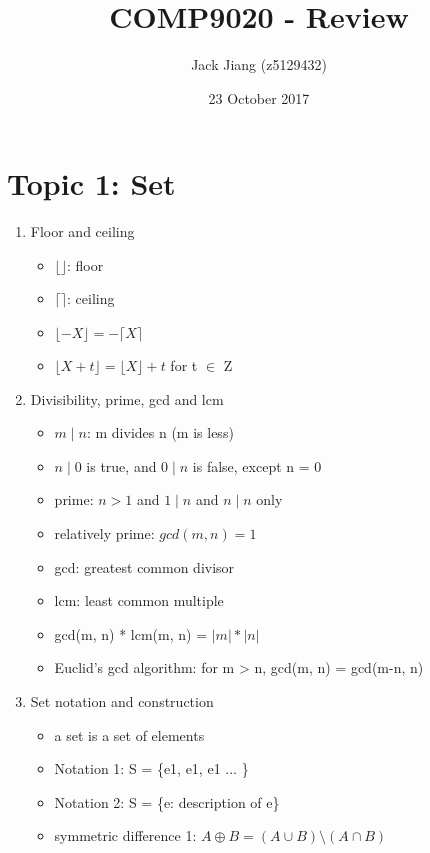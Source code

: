 \documentclass[11pt, a4paper]{article}
\begin{document}
\title{COMP9020 - Review}
\author{Jack Jiang (z5129432)}
\date{ 23 October 2017 }
\maketitle
\graphicspath{{/}}

\section*{Topic 1: Set}
\begin{enumerate}
    \item Floor and ceiling
        \begin{itemize}
            \item $\lfloor \rfloor$: floor
            \item $\lceil \rceil$: ceiling
            \item $\lfloor -X \rfloor = - \lceil X \rceil$
            \item $\lfloor X + t \rfloor = \lfloor X \rfloor + t$ for t $\in$ Z
        \end{itemize}
    \item Divisibility, prime, gcd and lcm
        \begin{itemize}
            \item $m \mid n$: m divides n (m is less)
            \item $n \mid 0$ is true, and $0 \mid n$ is false, except n = 0
            \item prime: $n > 1$ and $1 \mid n$ and $n \mid n$ only
            \item relatively prime: $gcd(m, n) = 1$
            \item gcd: greatest common divisor
            \item lcm: least common multiple
            \item gcd(m, n) * lcm(m, n) = $|m| * |n|$
            \item Euclid's gcd algorithm: for m > n, gcd(m, n) = gcd(m-n, n)
        \end{itemize}
    \item Set notation and construction
        \begin{itemize}
            \item a set is a set of elements
            \item Notation 1: S = \{e1, e1, e1 ... \}
            \item Notation 2: S = \{e: description of e\}
            \item symmetric difference 1: $A \oplus B = (A \cup B) \setminus (A \cap B)$

\end{itemize}
\end{enumerate}
\end{document}
